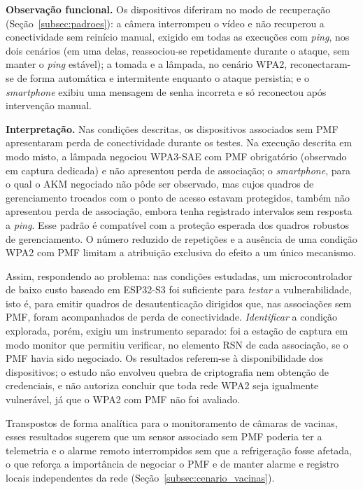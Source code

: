 \textbf{Observação funcional.} Os dispositivos diferiram no modo de recuperação (Seção~\ref{subsec:padroes}): a câmera interrompeu o vídeo e não recuperou a conectividade sem reinício manual, exigido em todas as execuções com \textit{ping}, nos dois cenários (em uma delas, reassociou-se repetidamente durante o ataque, sem manter o \textit{ping} estável); a tomada e a lâmpada, no cenário WPA2, reconectaram-se de forma automática e intermitente enquanto o ataque persistia; e o \textit{smartphone} exibiu uma mensagem de senha incorreta e só reconectou após intervenção manual.

\textbf{Interpretação.} Nas condições descritas, os dispositivos associados sem PMF apresentaram perda de conectividade durante os testes. Na execução descrita em modo misto, a lâmpada negociou WPA3-SAE com PMF obrigatório (observado em captura dedicada) e não apresentou perda de associação; o \textit{smartphone}, para o qual o AKM negociado não pôde ser observado, mas cujos quadros de gerenciamento trocados com o ponto de acesso estavam protegidos, também não apresentou perda de associação, embora tenha registrado intervalos sem resposta a \textit{ping}. Esse padrão é compatível com a proteção esperada dos quadros robustos de gerenciamento. O número reduzido de repetições e a ausência de uma condição WPA2 com PMF limitam a atribuição exclusiva do efeito a um único mecanismo.

Assim, respondendo ao problema: nas condições estudadas, um microcontrolador de baixo custo baseado em ESP32-S3 foi suficiente para \emph{testar} a vulnerabilidade, isto é, para emitir quadros de desautenticação dirigidos que, nas associações sem PMF, foram acompanhados de perda de conectividade. \emph{Identificar} a condição explorada, porém, exigiu um instrumento separado: foi a estação de captura em modo monitor que permitiu verificar, no elemento RSN de cada associação, se o PMF havia sido negociado. Os resultados referem-se à disponibilidade dos dispositivos; o estudo não envolveu quebra de criptografia nem obtenção de credenciais, e não autoriza concluir que toda rede WPA2 seja igualmente vulnerável, já que o WPA2 com PMF não foi avaliado.

Transpostos de forma analítica para o monitoramento de câmaras de vacinas, esses resultados sugerem que um sensor associado sem PMF poderia ter a telemetria e o alarme remoto interrompidos sem que a refrigeração fosse afetada, o que reforça a importância de negociar o PMF e de manter alarme e registro locais independentes da rede (Seção~\ref{subsec:cenario_vacinas}).

